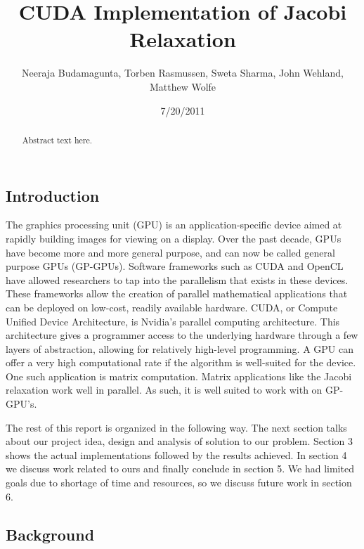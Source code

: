 \documentclass[10pt]{article}
\title{CUDA Implementation of Jacobi Relaxation}
\author{Neeraja Budamagunta, Torben Rasmussen, Sweta Sharma, John Wehland, Matthew Wolfe}
\date{7/20/2011}
\renewcommand\theFancyVerbLine{\small\arabic{FancyVerbLine}}
\begin{document}
\renewcommand{\theFancyVerbLine}{
  \sffamily\textcolor[rgb]{0.5,0.5,0.5}{\scriptsize\arabic{FancyVerbLine}}}

\maketitle


\begin{multicols}{2}
\begin{abstract}
Abstract text here.
\end{abstract}
\section{Introduction} %
The graphics processing unit (GPU) is an application-specific device aimed at rapidly building images for viewing on a display.
Over the past decade, GPUs have become more and more general purpose, and can now be called general purpose GPUs (GP-GPUs).
Software frameworks such as CUDA and OpenCL have allowed researchers to tap into the parallelism that exists in these devices.
These frameworks allow the creation of parallel mathematical applications that can be deployed on low-cost, readily available hardware.
CUDA, or Compute Unified Device Architecture, is Nvidia's parallel computing architecture.
This architecture gives a programmer access to the underlying hardware through a few layers of abstraction, allowing for relatively high-level programming.
A GPU can offer a very high computational rate if the algorithm is well-suited for the device.
One such application is matrix computation.
Matrix applications like the Jacobi relaxation work well in parallel.
As such, it is well suited to work with on GP-GPU’s.

The rest of this report is organized in the following way.
The next section talks about our project idea, design and analysis of solution to our problem.
Section 3 shows the actual implementations followed by the results achieved.
In section 4 we discuss work related to ours and finally conclude in section 5.
We had limited goals due to shortage of time and resources, so we discuss future work in section 6.

    \subsection{Background} %


\end{multicols}
\end{document}
